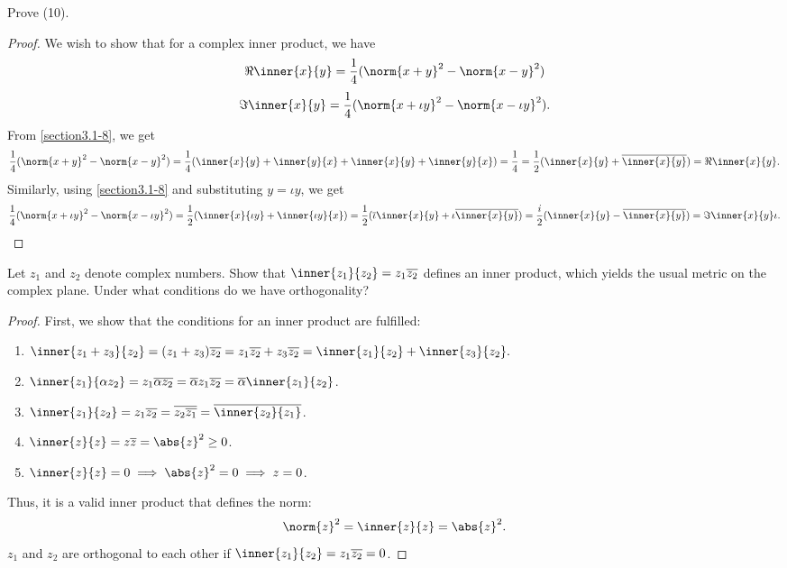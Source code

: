 \begin{question}
    Prove (10).
    \label{section3.1-9}
\end{question}
\begin{proof}
    We wish to show that for a complex inner product, we have
    \[\Re \inner{x}{y} = \frac{1}{4}(\norm{x+y}^2 - \norm{x-y}^2)\]
    \[\Im\inner{x}{y} = \frac{1}{4}(\norm{x+\iota y}^2 - \norm{x- \iota y}^2).\]
    From \ref{section3.1-8}, we get
    \[\frac{1}{4}(\norm{x+y}^2 - \norm{x-y}^2) = \frac{1}{4}(\inner{x}{y} + \inner{y}{x} + \inner{x}{y} + \inner{y}{x}) = \frac{1}{4} = \frac{1}{2}(\inner{x}{y} + \overline{\inner{x}{y}}) = \Re \inner{x}{y}. \]
    Similarly, using \ref{section3.1-8} and substituting $y = \iota y$, we get
    \[\frac{1}{4}(\norm{x+\iota y}^2 - \norm{x-\iota y}^2) = \frac{1}{2}(\inner{x}{\iota y} + \inner{\iota y}{x}) = \frac{1}{2}(\overline{\iota} \inner{x}{y} + \iota \overline{\inner{x}{y}}) = \frac{i}{2}(\inner{x}{y} - \overline{\inner{x}{y}}) = \Im \inner{x}{y} \iota. \]
\end{proof}

\begin{question}
    Let $z_1$ and $z_2$ denote complex numbers. Show that $\inner{z_1}{z_2} = z_1 \overline{z_2}$ defines an inner product, which yields the usual metric on the complex plane. Under what conditions do we have orthogonality?
    \label{section3.1-10}
\end{question}
\begin{proof}
    First, we show that the conditions for an inner product are fulfilled:
    \begin{enumerate}
        \item $\inner{z_1+z_3}{z_2} = (z_1 + z_3)\overline{z_2} = z_1 \overline{z_2} + z_3\overline{z_2} = \inner{z_1}{z_2} + \inner{z_3}{z_2}.$
        \item $\inner{z_1}{\alpha z_2} = z_1 \overline{\alpha z_2} = \overline{\alpha}z_1 \overline{z_2} = \overline{\alpha}\inner{z_1}{z_2}$.
        \item $\inner{z_1}{z_2} = z_1 \overline{z_2} = \overline{z_2 \overline{z_1}} = \overline{\inner{z_2}{z_1}}$.
        \item $\inner{z}{z} = z \overline{z} = \abs{z}^2 \geq 0$.
        \item $\inner{z}{z} = 0 \implies \abs{z}^2 = 0 \implies z = 0$.
    \end{enumerate}
    Thus, it is a valid inner product that defines the norm:
    \[\norm{z}^2 = \inner{z}{z} = \abs{z}^2.\]
    $z_1$ and $z_2$ are orthogonal to each other if $\inner{z_1}{z_2} = z_1 \overline{z_2} = 0$.
\end{proof}

